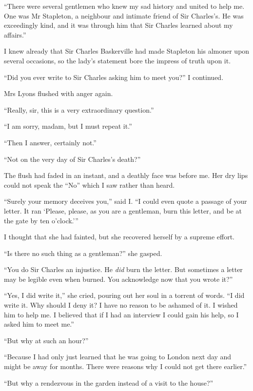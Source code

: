 \documentclass[paper=5.5in:8.5in,BCOR=7mm,twoside,DIV=calc,12pt,usegeometry,openany,chapterprefix,endperiod]{scrbook} %
\begin{document}
\enquote{There were several gentlemen who knew my sad history and united to help me. One was Mr Stapleton, a neighbour and intimate friend of Sir Charles's. He was exceedingly kind, and it was through him that Sir Charles learned about my affairs.}

I knew already that Sir Charles Baskerville had made Stapleton his almoner upon several occasions, so the lady's statement bore the impress of truth upon it.

\enquote{Did you ever write to Sir Charles asking him to meet you?} I continued.

Mrs Lyons flushed with anger again.

\enquote{Really, sir, this is a very extraordinary question.}

\enquote{I am sorry, madam, but I must repeat it.}

\enquote{Then I answer, certainly not.}

\enquote{Not on the very day of Sir Charles's death?}

The flush had faded in an instant, and a deathly face was before me. Her dry lips could not speak the \enquote{No} which I saw rather than heard.

\enquote{Surely your memory deceives you,} said I. \enquote{I could even quote a passage of your letter. It ran \enquote{Please, please, as you are a gentleman, burn this letter, and be at the gate by ten o'clock.}}

I thought that she had fainted, but she recovered herself by a supreme effort.

\enquote{Is there no such thing as a gentleman?} she gasped.

\enquote{You do Sir Charles an injustice. He \emph{did} burn the letter. But sometimes a letter may be legible even when burned. You acknowledge now that you wrote it?}

\enquote{Yes, I did write it,} she cried, pouring out her soul in a torrent of words. \enquote{I did write it. Why should I deny it? I have no reason to be ashamed of it. I wished him to help me. I believed that if I had an interview I could gain his help, so I asked him to meet me.}

\enquote{But why at such an hour?}

\enquote{Because I had only just learned that he was going to London next day and might be away for months. There were reasons why I could not get there earlier.}

\enquote{But why a rendezvous in the garden instead of a visit to the house?}
\end{document}
